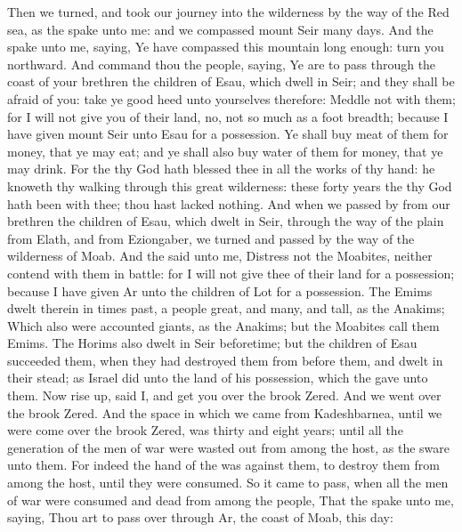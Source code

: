 \begin{biblechapter} %
 Then we turned, and took our journey into the wilderness by the way of the Red sea, as the \LORD spake unto me: and we compassed mount Seir many days.
\verse And the \LORD spake unto me, saying,
\verse Ye have compassed this mountain long enough: turn you northward.
\verse And command thou the people, saying, Ye are to pass through the coast of your brethren the children of Esau, which dwell in Seir; and they shall be afraid of you: take ye good heed unto yourselves therefore:
\verse Meddle not with them; for I will not give you of their land, no, not so much as a foot breadth; because I have given mount Seir unto Esau for a possession.
\verse Ye shall buy meat of them for money, that ye may eat; and ye shall also buy water of them for money, that ye may drink.
\verse For the \LORD thy God hath blessed thee in all the works of thy hand: he knoweth thy walking through this great wilderness: these forty years the \LORD thy God hath been with thee; thou hast lacked nothing.
\verse And when we passed by from our brethren the children of Esau, which dwelt in Seir, through the way of the plain from Elath, and from Eziongaber, we turned and passed by the way of the wilderness of Moab.
\verse And the \LORD said unto me, Distress not the Moabites, neither contend with them in battle: for I will not give thee of their land for a possession; because I have given Ar unto the children of Lot for a possession.
\verse The Emims dwelt therein in times past, a people great, and many, and tall, as the Anakims;
\verse Which also were accounted giants, as the Anakims; but the Moabites call them Emims.
\verse The Horims also dwelt in Seir beforetime; but the children of Esau succeeded them, when they had destroyed them from before them, and dwelt in their stead; as Israel did unto the land of his possession, which the \LORD gave unto them.
\verse Now rise up, said I, and get you over the brook Zered. And we went over the brook Zered.
\verse And the space in which we came from Kadeshbarnea, until we were come over the brook Zered, was thirty and eight years; until all the generation of the men of war were wasted out from among the host, as the \LORD sware unto them.
\verse For indeed the hand of the \LORD was against them, to destroy them from among the host, until they were consumed.
\verse So it came to pass, when all the men of war were consumed and dead from among the people,
\verse That the \LORD spake unto me, saying,
\verse Thou art to pass over through Ar, the coast of Moab, this day:

\end{biblechapter}
